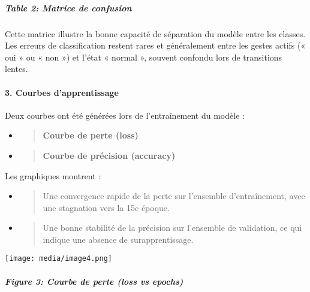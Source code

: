 \documentclass[
]{article}
\begin{document}
\hypertarget{table-2-matrice-de-confusion}{%
\subparagraph{Table 2: Matrice de confusion}\label{table-2-matrice-de-confusion}}

Cette matrice illustre la bonne capacité de séparation du modèle entre les classes. Les erreurs de classification restent rares et généralement entre les gestes actifs (« oui » ou « non ») et l'état « normal », souvent confondu lors de transitions lentes.

\hypertarget{courbes-dapprentissage}{%
\paragraph{\texorpdfstring{\textbf{3. Courbes d'apprentissage}}{3. Courbes d'apprentissage}}\label{courbes-dapprentissage}}

Deux courbes ont été générées lors de l'entraînement du modèle :

\begin{itemize}
\item
  \begin{quote}
  \textbf{Courbe de perte (loss)\\
  }
  \end{quote}
\item
  \begin{quote}
  \textbf{Courbe de précision (accuracy)\\
  }
  \end{quote}
\end{itemize}

Les graphiques montrent :

\begin{itemize}
\item
  \begin{quote}
  Une convergence rapide de la perte sur l'ensemble d'entraînement, avec une stagnation vers la 15e époque.
  \end{quote}
\item
  \begin{quote}
  Une bonne stabilité de la précision sur l'ensemble de validation, ce qui indique une absence de surapprentissage.
  \end{quote}
\end{itemize}

\texttt{[image: media/image4.png]}

\hypertarget{figure-3-courbe-de-perte-loss-vs-epochs}{%
\subparagraph{Figure 3: Courbe de perte (loss vs epochs)}\label{figure-3-courbe-de-perte-loss-vs-epochs}}
\end{document}
